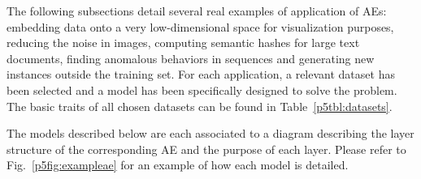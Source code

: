 The following subsections detail several real examples of application of AEs: embedding data onto a very low-dimensional space for visualization purposes, reducing the noise in images, computing semantic hashes for large text documents, finding anomalous behaviors in sequences and generating new instances outside the training set. For each application, a relevant dataset has been selected and a model has been specifically designed to solve the problem. The basic traits of all chosen datasets can be found in Table~\ref{p5tbl:datasets}.


\begin{table}[hb]
    \centering
    \caption{\label{p5tbl:datasets}Main traits of datasets used for the experiments}
\end{table}


The models described below are each associated to a diagram describing the layer structure of the corresponding AE and the purpose of each layer. Please refer to Fig.~\ref{p5fig:exampleae} for an example of how each model is detailed.


